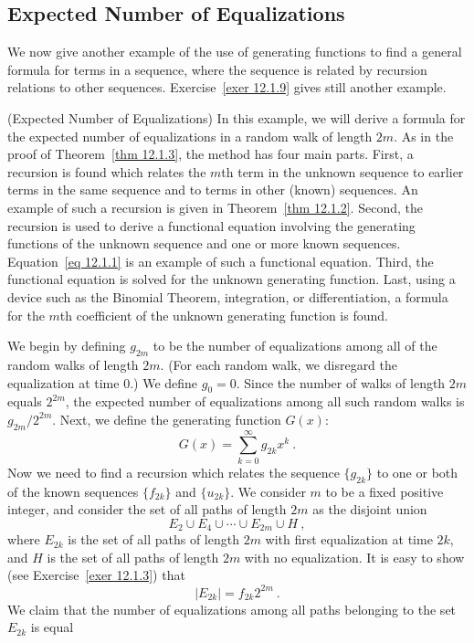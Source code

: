 \subsection*{Expected Number of Equalizations}
We now give another example of the use of generating functions to find a general formula for
terms in a sequence, where the sequence is related by recursion relations to other sequences.
Exercise~\ref{exer 12.1.9} gives still another example.
\begin{example}(Expected Number of Equalizations)\label{exam
12.1.1} 
In this example, we will derive a formula for the expected number of equalizations in a random
walk of length $2m$.  As in the proof of Theorem~\ref{thm 12.1.3}, the method has four main parts. 
First, a recursion is found which relates the $m$th term in the unknown sequence to earlier
terms in the same sequence and to terms in other (known) sequences.  An example of such
a recursion is given in Theorem~\ref{thm 12.1.2}.  Second, the recursion is used to derive a
functional equation involving the generating functions of the unknown sequence and one or more
known sequences.  Equation~\ref{eq 12.1.1} is an example of such a functional equation.  Third, the
functional equation is solved for the unknown generating function.  Last, using a device such
as the Binomial Theorem, integration, or differentiation, a formula for the $m$th coefficient
of the unknown generating function is found.
\par
We begin by defining $g_{2m}$ to be the number of equalizations among all of the random walks
of length $2m$.  (For each random walk, we disregard the equalization at time 0.)  We
define $g_0 = 0$.  Since  the number of walks of length $2m$ equals $2^{2m}$, the expected number
of equalizations among all such random walks is $g_{2m}/2^{2m}$.  Next, we define
the generating function
$G(x)$:
$$G(x) = \sum_{k = 0}^\infty g_{2k}x^k\ .$$
Now we need to find a recursion which relates the sequence $\{g_{2k}\}$ to one or both of the
known sequences $\{f_{2k}\}$ and $\{u_{2k}\}$.  We consider $m$ to be a fixed positive integer,
and consider the set of all paths of length $2m$ as the disjoint union
$$ E_2 \cup E_4 \cup \cdots \cup E_{2m} \cup H\ ,$$
where $E_{2k}$ is the set of all paths of length $2m$ with first equalization at time $2k$,
and $H$ is the set of all paths of length $2m$ with no equalization.  It is easy to show (see
Exercise~\ref{exer 12.1.3}) that
$$|E_{2k}| = f_{2k} 2^{2m}\ .$$
We claim that the number of equalizations among all paths belonging to the set $E_{2k}$ is equal

\end{example}
